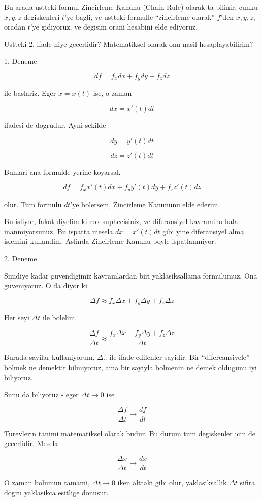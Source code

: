 \documentclass[12pt,fleqn]{article}
\begin{document}
Bu arada ustteki formul Zincirleme Kanunu (Chain Rule) olarak ta bilinir,
cunku $x,y,z$ degiskenleri $t$'ye bagli, ve ustteki formulle ``zincirleme
olarak'' $f$'den $x,y,z$, oradan $t$'ye gidiyoruz, ve degisim orani
hesabini elde ediyoruz.

Ustteki 2. ifade niye gecerlidir? Matematiksel olarak onu nasil
hesaplayabilirim? 

1. Deneme

\[ df = f_xdx + f_ydy + f_zdz \]

ile baslariz. Eger $x=x(t)$ ise, o zaman

\[ dx = x'(t)dt \]

ifadesi de dogrudur. Ayni sekilde

\[ dy = y'(t)dt \]

\[ dz = z'(t)dt \]

Bunlari ana formulde yerine koyarsak

\[ df = f_xx'(t)dx + f_yy'(t)dy + f_zz'(t)dz \]

olur. Tum formulu $dt$'ye bolersem, Zincirleme Kanununu elde ederim. 

Bu isliyor, fakat diyelim ki cok suphecisiniz, ve diferansiyel kavramina
hala inanmiyorsunuz. Bu ispatta mesela $dx = x'(t)dt$ gibi yine
diferansiyel alma islemini kullandim. Aslinda Zincirleme Kanunu boyle
ispatlanmiyor. 

2. Deneme

Simdiye kadar guvendigimiz kavramlardan biri yaklasiksallama
formulumuz. Ona guveniyoruz. O da diyor ki 

\[ \Delta f \approx f_x\Delta x + f_y \Delta y + f_z \Delta z \]

Her seyi $\Delta t$ ile bolelim. 

\[ \frac{\Delta f}{\Delta t} \approx 
\frac{f_x\Delta x + f_y \Delta y + f_z \Delta z }{\Delta t}\]

Burada sayilar kullaniyorum, $\Delta ..$ ile ifade edilenler sayidir. Bir
``difereansiyele'' bolmek ne demektir bilmiyoruz, ama bir sayiyla bolmenin
ne demek oldugunu iyi biliyoruz. 

Sunu da biliyoruz - eger $\Delta t \to 0$ ise 

\[ \frac{\Delta f}{\Delta t} \to \frac{df}{dt} \]

Turevlerin tanimi matematiksel olarak budur. Bu durum tum degiskenler icin
de gecerlidir. Mesela

\[ \frac{\Delta x}{\Delta t} \to \frac{dx}{dt} \]

O zaman bolumun tamami, $\Delta t \to 0$ iken alttaki gibi olur,
yaklasiksallik $\Delta t$ sifira dogru yaklasikca esitlige donusur.
\end{document}

